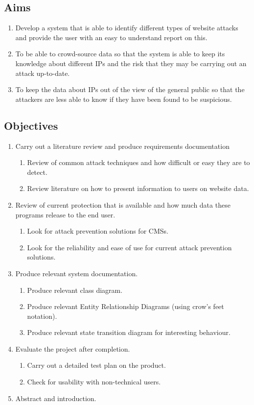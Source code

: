\subsection{Aims}
\begin{enumerate}
    \item Develop a system that is able to identify different types of website attacks and provide the user with an easy to understand report on this.
    \item To be able to crowd-source data so that the system is able to keep its knowledge about different IPs and the risk that they may be carrying out an attack up-to-date.
    \item To keep the data about IPs out of the view of the general public so that the attackers are less able to know if they have been found to be suspicious.
\end{enumerate}

\subsection{Objectives}
\begin{enumerate}
    \item Carry out a literature review and produce requirements documentation
    \begin{enumerate}
        \item Review of common attack techniques and how difficult or easy they are to detect.
        \item Review literature on how to present information to users on website data.
    \end{enumerate}
    \item Review of current protection that is available and how much data these programs release to the end user.
    \begin{enumerate}
        \item Look for attack prevention solutions for CMSs.
        \item Look for the reliability and ease of use for current attack prevention solutions.
    \end{enumerate}
    \item Produce relevant system documentation.
    \begin{enumerate}
        \item Produce relevant class diagram.
        \item Produce relevant Entity Relationship Diagrams (using crow's feet notation). 
        \item Produce relevant state transition diagram for interesting behaviour.
    \end{enumerate}
    \item Evaluate the project after completion.
    \begin{enumerate}
        \item Carry out a detailed test plan on the product.
        \item Check for usability with non-technical users.
    \end{enumerate}
    \item Abstract and introduction.
\end{enumerate}

